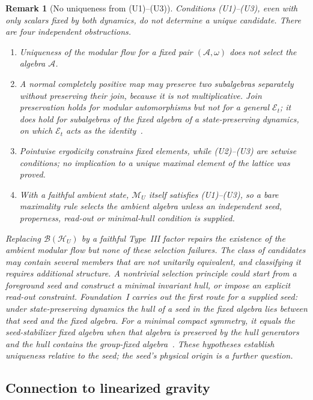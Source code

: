 \documentclass[12pt,a4paper]{article}
\newtheorem{remark}[theorem]{Remark}
\begin{document}
\begin{remark}[No uniqueness from (U1)--(U3)]
\label{thm:uniqueness}
Conditions (U1)--(U3), even with only scalars fixed by both dynamics, do not determine a unique candidate. There are four independent obstructions.
\begin{enumerate}
\item Uniqueness of the modular flow for a fixed pair $(\mathcal A,\omega)$ does not select the algebra $\mathcal A$.
\item A normal completely positive map may preserve two subalgebras separately without preserving their join, because it is not multiplicative. Join preservation holds for modular automorphisms but not for a general $\mathcal E_t$; it does hold for subalgebras of the fixed algebra of a state-preserving dynamics, on which $\mathcal E_t$ acts as the identity~\cite{FoundationI}.
\item Pointwise ergodicity constrains fixed elements, while (U2)--(U3) are setwise conditions; no implication to a unique maximal element of the lattice was proved.
\item With a faithful ambient state, $\mathcal M_U$ itself satisfies (U1)--(U3), so a bare maximality rule selects the ambient algebra unless an independent seed, properness, read-out or minimal-hull condition is supplied.
\end{enumerate}
Replacing $\mathcal B(\mathcal H_U)$ by a faithful Type~III factor repairs the existence of the ambient modular flow but none of these selection failures. The class of candidates may contain several members that are not unitarily equivalent, and classifying it requires additional structure. A nontrivial selection principle could start from a foreground seed and construct a minimal invariant hull, or impose an explicit read-out constraint. Foundation~I carries out the first route for a supplied seed: under state-preserving dynamics the hull of a seed in the fixed algebra lies between that seed and the fixed algebra. For a minimal compact symmetry, it equals the seed-stabilizer fixed algebra when that algebra is preserved by the hull generators and the hull contains the group-fixed algebra~\cite{FoundationI}. These hypotheses establish uniqueness relative to the seed; the seed's physical origin is a further question.
\end{remark}

\subsection{Connection to linearized gravity}
\label{sec:linearized}
\end{document}

